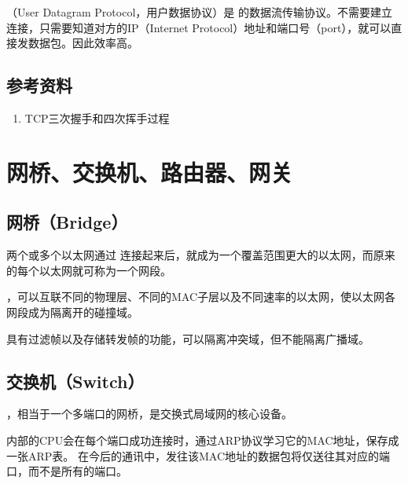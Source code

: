\documentclass[letterpaper,10pt,english]{sphinxmanual}
\begin{document}
 （User Datagram Protocol，用户数据协议）是  的数据流传输协议。不需要建立连接，只需要知道对方的IP（Internet Protocol）地址和端口号（port），就可以直接发数据包。因此效率高。


\subsection{参考资料}
\label{\detokenize{computerNetwork/02_tcp:id4}}\begin{enumerate}
\item {} 
TCP三次握手和四次挥手过程

\end{enumerate}
\begin{quote}

\end{quote}


\section{网桥、交换机、路由器、网关}
\label{\detokenize{computerNetwork/03_router::doc}}\label{\detokenize{computerNetwork/03_router:id1}}

\subsection{网桥（Bridge）}
\label{\detokenize{computerNetwork/03_router:bridge}}
两个或多个以太网通过  连接起来后，就成为一个覆盖范围更大的以太网，而原来的每个以太网就可称为一个网段。

 ，可以互联不同的物理层、不同的MAC子层以及不同速率的以太网，使以太网各网段成为隔离开的碰撞域。

 具有过滤帧以及存储转发帧的功能，可以隔离冲突域，但不能隔离广播域。


\subsection{交换机（Switch）}
\label{\detokenize{computerNetwork/03_router:switch}}
 ，相当于一个多端口的网桥，是交换式局域网的核心设备。

 内部的CPU会在每个端口成功连接时，通过ARP协议学习它的MAC地址，保存成一张ARP表。
在今后的通讯中，发往该MAC地址的数据包将仅送往其对应的端口，而不是所有的端口。
\end{document}
